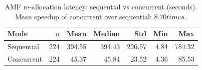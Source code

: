 \begin{table}[htbp]
\centering
\caption{AMF re-allocation latency: sequential vs concurrent (seconds). Mean speedup of concurrent over sequential: 8.70$\\times$.}
\label{tab:comparison}
\begin{tabular}{lrrrrrr}
\hline
Mode & $n$ & Mean & Median & Std & Min & Max \\
\hline
Sequential & 224 & 394.55 & 394.43 & 226.57 & 4.84 & 784.32 \\
Concurrent & 224 & 45.37 & 45.84 & 23.52 & 4.36 & 85.53 \\
\hline
\end{tabular}
\end{table}
